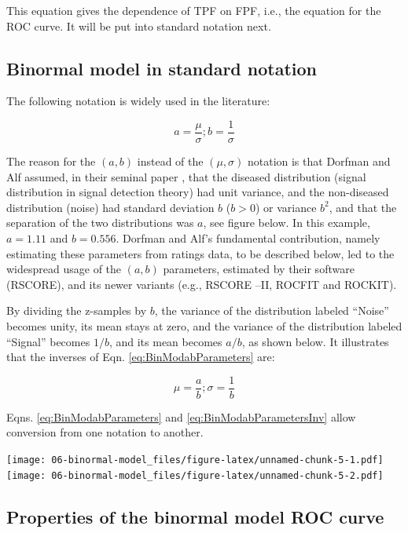 \documentclass[
]{book}
\begin{document}
This equation gives the dependence of TPF on FPF, i.e., the equation for the ROC curve. It will be put into standard notation next.

\hypertarget{binormal-model-in-standard-notation}{%
\subsection{Binormal model in standard notation}\label{binormal-model-in-standard-notation}}

The following notation is widely used in the literature:

\begin{equation} 
a=\frac{\mu}{\sigma};b=\frac{1}{\sigma}
\label{eq:BinModabParameters}
\end{equation}

The reason for the \((a,b)\) instead of the \((\mu,\sigma)\) notation is that Dorfman and Alf assumed, in their seminal paper \citep{RN1081}, that the diseased distribution (signal distribution in signal detection theory) had unit variance, and the non-diseased distribution (noise) had standard deviation \(b\) (\(b > 0\)) or variance \(b^2\), and that the separation of the two distributions was \(a\), see figure below. In this example, \(a = 1.11\) and \(b = 0.556\). Dorfman and Alf's fundamental contribution, namely estimating these parameters from ratings data, to be described below, led to the widespread usage of the \((a,b)\) parameters, estimated by their software (RSCORE), and its newer variants (e.g., RSCORE --II, ROCFIT and ROCKIT).

By dividing the z-samples by \(b\), the variance of the distribution labeled ``Noise'' becomes unity, its mean stays at zero, and the variance of the distribution labeled ``Signal'' becomes \(1/b\), and its mean becomes \(a/b\), as shown below. It illustrates that the inverses of Eqn. \eqref{eq:BinModabParameters} are:

\begin{equation} 
\mu=\frac{a}{b};\sigma=\frac{1}{b}
\label{eq:BinModabParametersInv}
\end{equation}

Eqns. \eqref{eq:BinModabParameters} and \eqref{eq:BinModabParametersInv} allow conversion from one notation to another.

\texttt{[image: 06-binormal-model\_files/figure-latex/unnamed-chunk-5-1.pdf]} \texttt{[image: 06-binormal-model\_files/figure-latex/unnamed-chunk-5-2.pdf]}

\hypertarget{properties-of-the-binormal-model-roc-curve}{%
\subsection{Properties of the binormal model ROC curve}\label{properties-of-the-binormal-model-roc-curve}}
\end{document}
